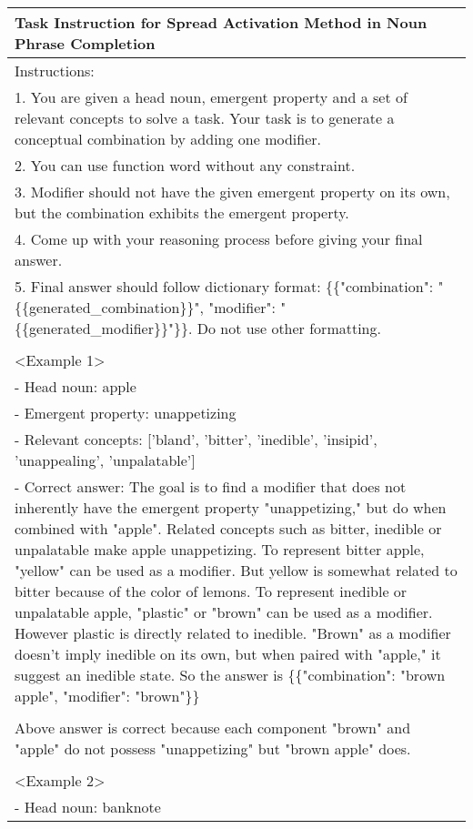 \begin{table*}[htbp]
\scriptsize
\centering
\begin{tabular}{@{}p{\linewidth}@{}}
\toprule
\textbf{Task Instruction for Spread Activation Method in Noun Phrase Completion}\\
\midrule
Instructions:\\
1. You are given a head noun, emergent property and a set of relevant concepts to solve a task. Your task is to generate a conceptual combination by adding one modifier.\\
2. You can use function word without any constraint.\\
3. Modifier should not have the given emergent property on its own, but the combination exhibits the emergent property.\\
4. Come up with your reasoning process before giving your final answer.\\
5. Final answer should follow dictionary format: \{\{"combination": "\{\{generated\_combination\}\}", "modifier": "\{\{generated\_modifier\}\}"\}\}. Do not use other formatting.\\
    \\
<Example 1>\\
- Head noun: apple\\
- Emergent property: unappetizing\\
- Relevant concepts: ['bland', 'bitter', 'inedible', 'insipid', 'unappealing', 'unpalatable']\\
- Correct answer: The goal is to find a modifier that does not inherently have the emergent property "unappetizing," but do when combined with "apple". Related concepts such as bitter, inedible or unpalatable make apple unappetizing. To represent bitter apple, "yellow" can be used as a modifier. But yellow is somewhat related to bitter because of the color of lemons. To represent inedible or unpalatable apple, "plastic" or "brown" can be used as a modifier. However plastic is directly related to inedible. "Brown" as a modifier doesn't imply inedible on its own, but when paired with "apple," it suggest an inedible state. So the answer is \{\{"combination": "brown apple", "modifier": "brown"\}\}\\
\\
Above answer is correct because each component "brown" and "apple" do not possess "unappetizing" but "brown apple" does.\\
\\
<Example 2>\\
- Head noun: banknote\\

\end{tabular}
\end{table*}
